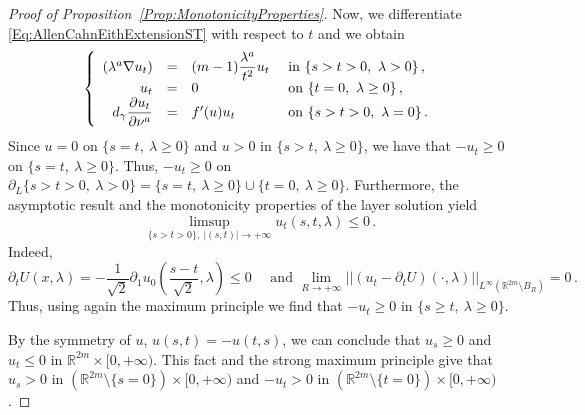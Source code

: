 \documentclass[12pt,reqno]{amsart}
\theoremstyle{definition}
\theoremstyle{remark}
\newcommand{\con}[1]{\mathbb{#1}}
\newcommand{\R}{\con{R}} %
\newcommand{\norm}[1]{\left | \left |{#1} \right | \right |}
\newcommand{\s}{\gamma}
\newcommand{\bpar}[1]{\left ( {#1}\right )}
\newcommand\beqc[1]{\left\{\begin{array}{#1}}
\newcommand\eeqc{\end{array} \right.}
\def\PDEsystem{rcll}
\let\div\relax
\DeclareMathOperator{\div}{div}
\numberwithin{equation}{section}
\begin{document}
\begin{proof}[Proof of Proposition~\ref{Prop:MonotonicityProperties}]
Now, we differentiate \eqref{Eq:AllenCahnEithExtensionST} with respect to $t$ and we obtain
$$
\beqc{\PDEsystem}
\div (\lambda^a \nabla u_t) &=& (m-1) \dfrac{\lambda^a}{t^2}u_t & \text{ in } \{ s > t > 0 ,\ \lambda > 0\}\,, \\
u_t& = & 0& \text{ on } \{t=0, \ \lambda \geq 0 \}\,, \\
d_\s \dfrac{\partial u_t}{\partial \nu^a}& = & f'(u)u_t& \text{ on }  \{ s > t > 0 , \ \lambda = 0\}\,.
\eeqc
$$
Since $u = 0$ on $\{s = t,\ \lambda \geq 0 \}$ and $u>0$ in $\{s > t,\ \lambda \geq 0 \}$, we have that $-u_t \geq 0$ on $\{s = t,\ \lambda \geq 0 \}$. Thus, $-u_t \geq 0$ on $\partial_L \{ s > t > 0 ,\ \lambda > 0\} = \{s = t,\ \lambda \geq 0 \}\cup \{t=0, \ \lambda \geq 0\}$. Furthermore, the asymptotic result and the monotonicity properties of the layer solution yield
$$
\limsup_{\{s> t>0\} ,\ |(s,t)|\to +\infty}  u_t(s,t,\lambda) \leq 0\,.
$$
Indeed, 
$$
\partial_t U (x,\lambda) = -\dfrac{1}{\sqrt{2}} \partial_1 u_0\bpar{\dfrac{s-t}{\sqrt{2}}, \lambda} \leq 0 \quad \text{ and } \lim_{R\to +\infty} \norm{(u_t - \partial_t U) (\cdot,\lambda) }_{L^\infty(\R^{2m}\setminus B_{R})} = 0\,.
$$
Thus, using again the maximum principle we find that $-u_t \geq 0$ in $\{ s \geq t,\ \lambda \geq 0\}$.

By the symmetry of $u$, $u(s,t)=-u(t,s)$, we can conclude that  $u_s \geq 0$ and $u_t \leq 0$ in $\R^{2m} \times [0, +\infty)$. This fact and the strong maximum principle give that $u_s > 0$ in $(\R^{2m}\setminus \{s=0\}) \times [0, +\infty)$ and $- u_t > 0$ in $(\R^{2m}\setminus \{t=0\}) \times [0, +\infty)$.


\end{proof}
\end{document}
